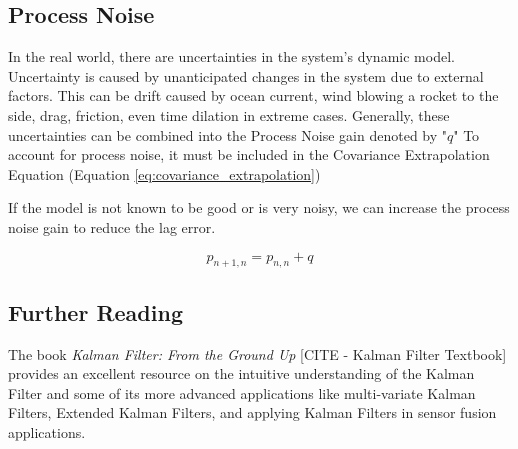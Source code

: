 \subsection{Process Noise} In the real world, there are uncertainties in the system's dynamic model.
Uncertainty is caused by unanticipated changes in the system due to external factors.
This can be drift caused by ocean current, wind blowing a rocket to the side, drag, friction, even time dilation in extreme cases.
Generally, these uncertainties can be combined into the Process Noise gain denoted by "$q$"
To account for process noise, it must be included in the Covariance Extrapolation Equation (Equation \ref{eq:covariance_extrapolation})

If the model is not known to be good or is very noisy, we can increase the process noise gain to reduce the lag error.

\begin{equation}
    p_{n+1,n} = p_{n,n} + q
\end{equation}

\subsection*{Further Reading}
The book \textit{Kalman Filter: From the Ground Up} [CITE - Kalman Filter Textbook] provides an excellent resource on the intuitive understanding of the Kalman Filter and some of its more advanced applications like multi-variate Kalman Filters, Extended Kalman Filters, and applying Kalman Filters in sensor fusion applications.
